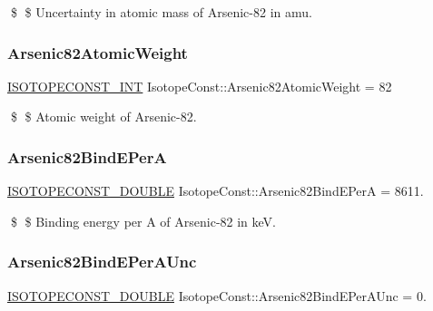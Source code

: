 \$ \$ Uncertainty in atomic mass of Arsenic-\/82 in amu. \mbox{\label{group___isotope_const-_arsenic-_as82_gad590d27dc1e3d7698dd40ca5d2c15ff4}} 
\subsubsection{\texorpdfstring{Arsenic82\+Atomic\+Weight}{Arsenic82AtomicWeight}}
{\footnotesize\ttfamily \mbox{\hyperlink{group___isotope_const-_macros_ga5f18360b3e99483a35c32d789e62621c}{I\+S\+O\+T\+O\+P\+E\+C\+O\+N\+S\+T\+\_\+\+I\+NT}} Isotope\+Const\+::\+Arsenic82\+Atomic\+Weight = 82}

\$ \$ Atomic weight of Arsenic-\/82. \mbox{\label{group___isotope_const-_arsenic-_as82_gadc40a44a1cc7702a8cdcb65d43de5901}} 
\subsubsection{\texorpdfstring{Arsenic82\+Bind\+E\+PerA}{Arsenic82BindEPerA}}
{\footnotesize\ttfamily \mbox{\hyperlink{group___isotope_const-_macros_ga8f45a7272ce02c0b4c65c44636ed719a}{I\+S\+O\+T\+O\+P\+E\+C\+O\+N\+S\+T\+\_\+\+D\+O\+U\+B\+LE}} Isotope\+Const\+::\+Arsenic82\+Bind\+E\+PerA = 8611.}

\$ \$ Binding energy per A of Arsenic-\/82 in keV. \mbox{\label{group___isotope_const-_arsenic-_as82_ga2f2eb0868ad96bc643de0cdfcf91af5c}} 
\subsubsection{\texorpdfstring{Arsenic82\+Bind\+E\+Per\+A\+Unc}{Arsenic82BindEPerAUnc}}
{\footnotesize\ttfamily \mbox{\hyperlink{group___isotope_const-_macros_ga8f45a7272ce02c0b4c65c44636ed719a}{I\+S\+O\+T\+O\+P\+E\+C\+O\+N\+S\+T\+\_\+\+D\+O\+U\+B\+LE}} Isotope\+Const\+::\+Arsenic82\+Bind\+E\+Per\+A\+Unc = 0.}


